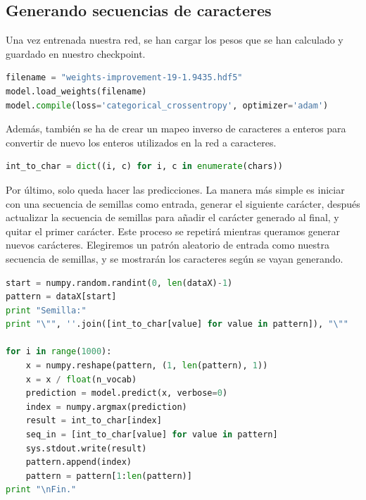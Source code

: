 \subsection{Generando secuencias de caracteres}
Una vez entrenada nuestra red, se han cargar los pesos que se han calculado y guardado en nuestro checkpoint.
\begin{lstlisting}[language=Python]
filename = "weights-improvement-19-1.9435.hdf5"
model.load_weights(filename)
model.compile(loss='categorical_crossentropy', optimizer='adam')
\end{lstlisting}
Además, también se ha de crear un mapeo inverso de caracteres a enteros para convertir de nuevo los enteros utilizados en la red a caracteres.
\begin{lstlisting}[language=Python]
int_to_char = dict((i, c) for i, c in enumerate(chars))
\end{lstlisting}
Por último, solo queda hacer las predicciones. La manera más simple es iniciar con una secuencia de semillas como entrada, generar el siguiente carácter, después actualizar la secuencia de semillas para añadir el carácter generado al final, y quitar el primer carácter. Este proceso se repetirá mientras queramos generar nuevos carácteres. Elegiremos un patrón aleatorio de entrada como nuestra secuencia de semillas, y se mostrarán los caracteres según se vayan generando.
\begin{lstlisting}[language=Python]
start = numpy.random.randint(0, len(dataX)-1)
pattern = dataX[start]
print "Semilla:"
print "\"", ''.join([int_to_char[value] for value in pattern]), "\""

for i in range(1000):
	x = numpy.reshape(pattern, (1, len(pattern), 1))
	x = x / float(n_vocab)
	prediction = model.predict(x, verbose=0)
	index = numpy.argmax(prediction)
	result = int_to_char[index]
	seq_in = [int_to_char[value] for value in pattern]
	sys.stdout.write(result)
	pattern.append(index)
	pattern = pattern[1:len(pattern)]
print "\nFin."
\end{lstlisting}

